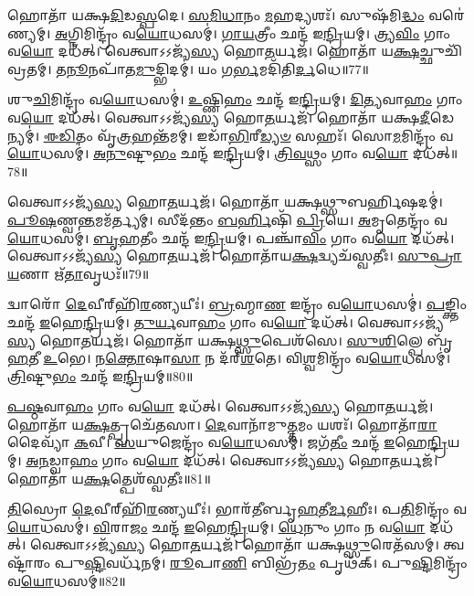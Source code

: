 𑌹𑍋𑌤𑌾᳴ 𑌯𑌕𑍍𑌷\-\ul{𑌦𑌿}\-𑌡\-\ul{𑌸𑍍𑌪}\-𑌦𑍇।
\-\ul{𑌸}\-\-\ul{𑌮𑌿}\-\-\ul{𑌧𑌾}\-𑌨𑌂 \ul{𑌮}\-𑌹𑌦𑍍𑌯𑌶𑌃᳴।
𑌸𑍁𑌷᳴𑌮𑌿\-\ul{𑌦𑍍𑌧𑌂} 𑌵𑌰𑍇॑𑌣𑍍𑌯𑌮𑍍।
\-\ul{𑌅}\-𑌗𑍍𑌨𑌿𑌮𑌿𑌨𑍍𑌦𑍍𑌰𑌂᳴ 𑌵\-\ul{𑌯𑍋}\-𑌧𑌸𑌮𑍍॑।
\-\ul{𑌗𑌾}\-\-\ul{𑌯}\-𑌤𑍍𑌰𑍀𑌂 𑌛𑌨𑍍𑌦᳴ 𑌇\-\ul{𑌨𑍍𑌦𑍍𑌰𑌿}\-𑌯𑌮𑍍।
𑌤𑍍𑌰𑍍𑌯\-\ul{𑌵𑌿𑌂} 𑌗𑌾𑌂 𑌵\-\ul{𑌯𑍋} 𑌦𑌧᳴𑌤𑍍।
𑌵𑍇𑌤𑍍𑌵𑌾𑌽𑌽𑌜𑍍𑌯᳴\-\ul{𑌸𑍍𑌯} 𑌹𑍋\-\ul{𑌤}\-𑌰𑍍𑌯𑌜᳴।
𑌹𑍋𑌤𑌾᳴ 𑌯\-\ul{𑌕𑍍𑌷}\-𑌚𑍍𑌛𑍁𑌚𑌿᳴𑌵𑍍𑌰𑌤𑌮𑍍।
𑌤\-\ul{𑌨𑍂}\-𑌨𑌪𑌾᳴𑌤\-\ul{𑌮𑍁}\-𑌦𑍍𑌭𑌿𑌦𑌮𑍍॑।
𑌯𑌂 𑌗\-\ul{𑌰𑍍𑌭}\-𑌮𑌦𑌿᳴𑌤𑌿\-\ul{𑌰𑍍𑌦}\-𑌧𑍇॥77॥

𑌶𑍁\-\ul{𑌚𑌿}\-𑌮𑌿𑌨𑍍𑌦𑍍𑌰𑌂᳴ 𑌵\-\ul{𑌯𑍋}\-𑌧𑌸𑌮𑍍॑।
\-\ul{𑌉}\-𑌷𑍍𑌣𑌿\-\ul{𑌹𑌂} 𑌛𑌨𑍍𑌦᳴ 𑌇\-\ul{𑌨𑍍𑌦𑍍𑌰𑌿}\-𑌯𑌮𑍍।
\-\ul{𑌦𑌿}\-\-\ul{𑌤𑍍𑌯}\-𑌵𑌾\-\ul{𑌹𑌂} 𑌗𑌾𑌂 𑌵\-\ul{𑌯𑍋} 𑌦𑌧᳴𑌤𑍍।
𑌵𑍇𑌤𑍍𑌵𑌾𑌽𑌽𑌜𑍍𑌯᳴\-\ul{𑌸𑍍𑌯} 𑌹𑍋\-\ul{𑌤}\-𑌰𑍍𑌯𑌜᳴।
𑌹𑍋𑌤𑌾᳴ 𑌯𑌕𑍍𑌷\-\ul{𑌦𑍀}\-𑌡𑍇𑌨𑍍𑌯𑌮𑍍॑।
\-\ul{𑌈}\-\-\ul{𑌡𑌿}\-𑌤𑌂 𑌵𑍃᳴\-\ul{𑌤𑍍𑌰}\-𑌹𑌨𑍍𑌤᳴𑌮𑌮𑍍।
𑌇𑌡𑌾᳴\-\ul{𑌭𑌿}\-𑌰𑍀\-\ul{𑌡𑍍𑌯}\-\-\ul{𑍞} 𑌸𑌹𑌃᳴।
𑌸𑍋\-\ul{𑌮}\-𑌮𑌿𑌨𑍍𑌦𑍍𑌰𑌂᳴ 𑌵\-\ul{𑌯𑍋}\-𑌧𑌸𑌮𑍍॑।
\-\ul{𑌅}\-\-\ul{𑌨𑍁}\-𑌷𑍍𑌟𑍁\-\ul{𑌭𑌂} 𑌛𑌨𑍍𑌦᳴ 𑌇\-\ul{𑌨𑍍𑌦𑍍𑌰𑌿}\-𑌯𑌮𑍍।
\-\ul{𑌤𑍍𑌰𑌿}\-\-\ul{𑌵}\-𑌥𑍍𑌸𑌂 𑌗𑌾𑌂 𑌵\-\ul{𑌯𑍋} 𑌦𑌧᳴𑌤𑍍॥78॥

𑌵𑍇𑌤𑍍𑌵𑌾𑌽𑌽𑌜𑍍𑌯᳴\-\ul{𑌸𑍍𑌯} 𑌹𑍋\-\ul{𑌤}\-𑌰𑍍𑌯𑌜᳴।
𑌹𑍋𑌤𑌾᳴ 𑌯𑌕𑍍𑌷𑌥𑍍𑌸𑍁𑌬𑌰𑍍\mbox{}\-\ul{𑌹𑌿}\-𑌷𑌦𑌮𑍍॑।
\-\ul{𑌪𑍂}\-\-\ul{𑌷}\-𑌣𑍍𑌵\-\ul{𑌨𑍍𑌤}\-𑌮𑌮᳴𑌰𑍍𑌤𑍍𑌯𑌮𑍍।
𑌸𑍀𑌦᳴𑌨𑍍𑌤𑌂 \ul{𑌬}\-\-\ul{𑌰𑍍}\-𑌹𑌿𑌷𑌿᳴ \ul{𑌪𑍍𑌰𑌿}\-𑌯𑍇।
\-\ul{𑌅}\-𑌮𑍃𑌤𑍇𑌨𑍍𑌦𑍍𑌰𑌂᳴ 𑌵\-\ul{𑌯𑍋}\-𑌧𑌸𑌮𑍍॑।
\-\ul{𑌬𑍃}\-\-\ul{𑌹}\-𑌤𑍀𑌂 𑌛𑌨𑍍𑌦᳴ 𑌇\-\ul{𑌨𑍍𑌦𑍍𑌰𑌿}\-𑌯𑌮𑍍।
𑌪𑌞𑍍𑌚𑌾᳴\-\ul{𑌵𑌿𑌂} 𑌗𑌾𑌂 𑌵\-\ul{𑌯𑍋} 𑌦𑌧᳴𑌤𑍍।
𑌵𑍇𑌤𑍍𑌵𑌾𑌽𑌽𑌜𑍍𑌯᳴\-\ul{𑌸𑍍𑌯} 𑌹𑍋\-\ul{𑌤}\-𑌰𑍍𑌯𑌜᳴।
𑌹𑍋𑌤𑌾᳴𑌯\-\ul{𑌕𑍍𑌷}\-𑌦𑍍𑌵𑍍𑌯𑌚᳴𑌸𑍍𑌵𑌤𑍀𑌃।
\-\ul{𑌸𑍁}\-\-\ul{𑌪𑍍𑌰𑌾}\-\-\ul{𑌯}\-𑌣𑌾 𑌋᳴\-\ul{𑌤𑌾}\-𑌵𑍃𑌧𑌃᳴॥79॥

𑌦𑍍𑌵𑌾𑌰𑍋᳴ \ul{𑌦𑍇}\-𑌵𑍀𑌰𑍍‌\mbox{}𑌹𑌿᳴\-\ul{𑌰}\-𑌣𑍍𑌯𑌯𑍀𑌃॑।
\-\ul{𑌬𑍍𑌰}\-𑌹𑍍𑌮𑌾\-\ul{𑌣} 𑌇𑌨𑍍𑌦𑍍𑌰𑌂᳴ 𑌵\-\ul{𑌯𑍋}\-𑌧𑌸𑌮𑍍॑।
\-\ul{𑌪}\-𑌙𑍍𑌕𑍍𑌤𑌿𑌂 𑌛𑌨𑍍𑌦᳴ \ul{𑌇}\-𑌹𑍇\-\ul{𑌨𑍍𑌦𑍍𑌰𑌿}\-𑌯𑌮𑍍।
\-\ul{𑌤𑍁}\-\-\ul{𑌰𑍍𑌯}\-𑌵𑌾\-\ul{𑌹𑌂} 𑌗𑌾𑌂 𑌵\-\ul{𑌯𑍋} 𑌦𑌧᳴𑌤𑍍।
𑌵𑍇𑌤𑍍𑌵𑌾𑌽𑌽𑌜𑍍𑌯᳴\-\ul{𑌸𑍍𑌯} 𑌹𑍋\-\ul{𑌤}\-𑌰𑍍𑌯𑌜᳴।
𑌹𑍋𑌤𑌾᳴ 𑌯𑌕𑍍𑌷\-\ul{𑌥𑍍𑌸𑍁}\-𑌪𑍇𑌶᳴𑌸𑍇।
\-\ul{𑌸𑍁}\-\-\ul{𑌶𑌿}\-𑌲𑍍𑌪𑍇 𑌬𑍃᳴\-\ul{𑌹}\-𑌤𑍀 \ul{𑌉}\-𑌭𑍇।
𑌨\-\ul{𑌕𑍍𑌤𑍋}\-𑌷𑌾\-\ul{𑌸𑌾} 𑌨 𑌦᳴𑌰𑍍‌\mbox{}\-\ul{𑌶}\-𑌤𑍇।
𑌵𑌿\-\ul{𑌶𑍍𑌵}\-𑌮𑌿𑌨𑍍𑌦𑍍𑌰𑌂᳴ 𑌵\-\ul{𑌯𑍋}\-𑌧𑌸𑌮𑍍॑।
\-\ul{𑌤𑍍𑌰𑌿}\-𑌷𑍍𑌟𑍁\-\ul{𑌭𑌂} 𑌛𑌨𑍍𑌦᳴ 𑌇\-\ul{𑌨𑍍𑌦𑍍𑌰𑌿}\-𑌯𑌮𑍍॥80॥

\-\ul{𑌪}\-\-\ul{𑌷𑍍𑌠}\-𑌵𑌾\-\ul{𑌹𑌂} 𑌗𑌾𑌂 𑌵\-\ul{𑌯𑍋} 𑌦𑌧᳴𑌤𑍍।
𑌵𑍇𑌤𑍍𑌵𑌾𑌽𑌽𑌜𑍍𑌯᳴\-\ul{𑌸𑍍𑌯} 𑌹𑍋\-\ul{𑌤}\-𑌰𑍍𑌯𑌜᳴।
𑌹𑍋𑌤𑌾᳴ 𑌯\-\ul{𑌕𑍍𑌷}\-𑌤𑍍𑌪𑍍𑌰𑌚𑍇᳴𑌤𑌸𑌾।
\-\ul{𑌦𑍇}\-𑌵𑌾𑌨𑌾᳴𑌮𑍁\-\ul{𑌤𑍍𑌤}\-𑌮𑌂 𑌯𑌶𑌃᳴।
𑌹𑍋𑌤𑌾᳴\-\ul{𑌰𑌾} 𑌦𑍈𑌵𑍍𑌯𑌾᳴ \ul{𑌕}\-𑌵𑍀।
\-\ul{𑌸}\-𑌯𑍁𑌜𑍇𑌨𑍍𑌦𑍍𑌰𑌂᳴ 𑌵\-\ul{𑌯𑍋}\-𑌧𑌸𑌮𑍍॑।
𑌜𑌗᳴\-\ul{𑌤𑍀𑌂} 𑌛𑌨𑍍𑌦᳴ \ul{𑌇}\-𑌹𑍇\-\ul{𑌨𑍍𑌦𑍍𑌰𑌿}\-𑌯𑌮𑍍।
\-\ul{𑌅}\-\-\ul{𑌨}\-𑌡𑍍𑌵𑌾\-\ul{𑌹𑌂} 𑌗𑌾𑌂 𑌵\-\ul{𑌯𑍋} 𑌦𑌧᳴𑌤𑍍।
𑌵𑍇𑌤𑍍𑌵𑌾𑌽𑌽𑌜𑍍𑌯᳴\-\ul{𑌸𑍍𑌯} 𑌹𑍋\-\ul{𑌤}\-𑌰𑍍𑌯𑌜᳴।
𑌹𑍋𑌤𑌾᳴ 𑌯\-\ul{𑌕𑍍𑌷}\-𑌤𑍍𑌪𑍇𑌶᳴𑌸𑍍𑌵𑌤𑍀𑌃॥81॥

\-\ul{𑌤𑌿}\-𑌸𑍍𑌰𑍋 \ul{𑌦𑍇}\-𑌵𑍀𑌰𑍍‌\mbox{}𑌹𑌿᳴\-\ul{𑌰}\-𑌣𑍍𑌯𑌯𑍀𑌃॑।
𑌭𑌾𑌰᳴𑌤𑍀𑌰𑍍𑌬𑍃\-\ul{𑌹}\-𑌤𑍀\-\ul{𑌰𑍍𑌮}\-𑌹𑍀𑌃।
𑌪\-\ul{𑌤𑌿}\-𑌮𑌿𑌨𑍍𑌦𑍍𑌰𑌂᳴ 𑌵\-\ul{𑌯𑍋}\-𑌧𑌸𑌮𑍍॑।
\-\ul{𑌵𑌿}\-𑌰𑌾\-\ul{𑌜𑌂} 𑌛𑌨𑍍𑌦᳴ \ul{𑌇}\-𑌹𑍇\-\ul{𑌨𑍍𑌦𑍍𑌰𑌿}\-𑌯𑌮𑍍।
\-\ul{𑌧𑍇}\-𑌨𑍁𑌂 𑌗𑌾𑌂 𑌨 𑌵\-\ul{𑌯𑍋} 𑌦𑌧᳴𑌤𑍍।
𑌵𑍇𑌤𑍍𑌵𑌾𑌽𑌽𑌜𑍍𑌯᳴\-\ul{𑌸𑍍𑌯} 𑌹𑍋\-\ul{𑌤}\-𑌰𑍍𑌯𑌜᳴।
𑌹𑍋𑌤𑌾᳴ 𑌯𑌕𑍍𑌷\-\ul{𑌥𑍍𑌸𑍁}\-𑌰𑍇𑌤᳴𑌸𑌮𑍍।
𑌤𑍍𑌵𑌷𑍍𑌟𑌾᳴𑌰𑌂 𑌪𑍁\-\ul{𑌷𑍍𑌟𑌿}\-𑌵𑌰𑍍𑌧᳴𑌨𑌮𑍍।
\-\ul{𑌰𑍂}\-𑌪𑌾\-\ul{𑌣𑌿} 𑌬𑌿𑌭𑍍𑌰᳴\-\ul{𑌤𑌂} 𑌪𑍃𑌥᳴𑌕𑍍।
𑌪𑍁\-\ul{𑌷𑍍𑌟𑌿}\-𑌮𑌿𑌨𑍍𑌦𑍍𑌰𑌂᳴ 𑌵\-\ul{𑌯𑍋}\-𑌧𑌸𑌮𑍍॑॥82॥


